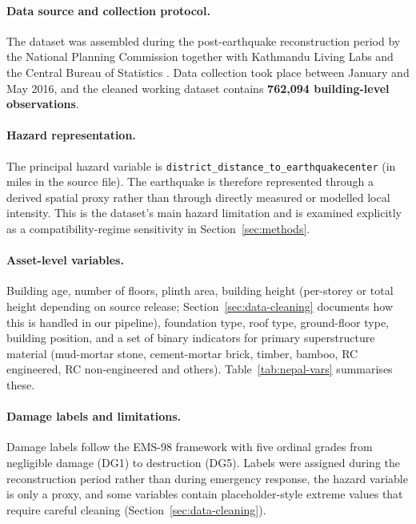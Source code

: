 \documentclass[11pt,a4paper]{article}
\begin{document}
\paragraph{Data source and collection protocol.} The dataset was assembled during the post-earthquake reconstruction period by the National Planning Commission together with Kathmandu Living Labs and the Central Bureau of Statistics \citep{ghimire2022nepal}. Data collection took place between January and May 2016, and the cleaned working dataset contains \textbf{762{,}094 building-level observations}.

\paragraph{Hazard representation.} The principal hazard variable is \texttt{district\_distance\_to\_earthquakecenter} (in miles in the source file). The earthquake is therefore represented through a derived spatial proxy rather than through directly measured or modelled local intensity. This is the dataset's main hazard limitation and is examined explicitly as a compatibility-regime sensitivity in Section~\ref{sec:methods}.

\paragraph{Asset-level variables.} Building age, number of floors, plinth area, building height (per-storey or total height depending on source release; Section~\ref{sec:data-cleaning} documents how this is handled in our pipeline), foundation type, roof type, ground-floor type, building position, and a set of binary indicators for primary superstructure material (mud-mortar stone, cement-mortar brick, timber, bamboo, RC engineered, RC non-engineered and others). Table~\ref{tab:nepal-vars} summarises these.

\paragraph{Damage labels and limitations.} Damage labels follow the EMS-98 framework \citep{grunthal1998ems98} with five ordinal grades from negligible damage (DG1) to destruction (DG5). Labels were assigned during the reconstruction period rather than during emergency response, the hazard variable is only a proxy, and some variables contain placeholder-style extreme values that require careful cleaning (Section~\ref{sec:data-cleaning}).
\end{document}
